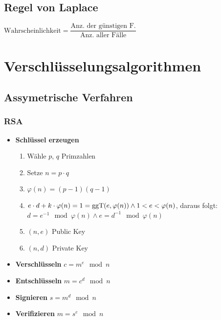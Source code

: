 \documentclass[8pt,a4paper,landscape]{article}
\begin{document}
\begin{multicols}{4}
\subsection{Regel von Laplace}
$\textrm{Wahrscheinlichkeit} = \dfrac{\textrm{Anz. der günstigen F.}}{\textrm{Anz. aller Fälle}}$

\section{Verschlüsselungsalgorithmen}
\subsection{Assymetrische Verfahren}
\subsubsection{RSA}

\begin{itemize}[itemsep=2pt, leftmargin=0pt] 
\item[] \textbf{Schlüssel erzeugen} \begin{enumerate}[itemsep=1pt] 
    \item Wähle $p$, $q$ Primzahlen
    \item Setze $n = p \cdot q$
    \item $\varphi(n) = (p-1)(q-1)$
    \item $e \cdot d + k \cdot \varphi(n) = 1 = \operatorname {ggT}(e, \varphi(n)) \land \\ 1<e<\varphi(n)$, daraus folgt: \\
    $d = e^{-1} \mod \varphi(n) \land e = d^{-1} \mod \varphi(n)$
    \item $(n,e)$ Public Key
    \item $(n,d)$ Private Key
\end{enumerate}
\item[] \textbf{Verschlüsseln} $c = m^{e} \mod n$ 
\item[] \textbf{Entschlüsseln} $m = c^{d} \mod n$
\item[] \textbf{Signieren} $s = m^d \mod n$
\item[] \textbf{Verifizieren} $m = s^e \mod n$
\end{itemize}


\end{multicols}
\end{document}
